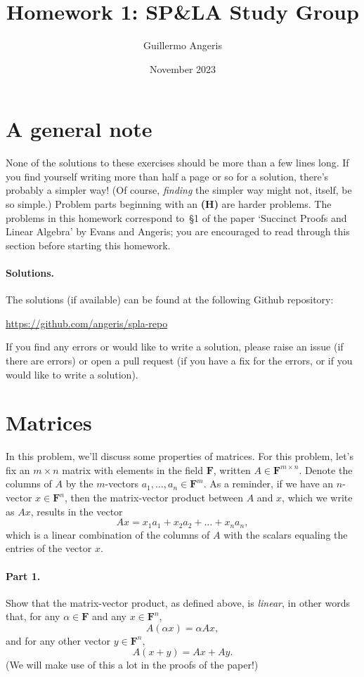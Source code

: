 \documentclass[12pt,hidelinks]{article}
\title{Homework 1: SP\&LA Study Group}
\author{Guillermo Angeris}
\date{November 2023}
\newcommand{\field}{\mathbf{F}}
\begin{document}
 
\maketitle 

\section*{A general note}
None of the solutions to these exercises should be more than a few lines long.
If you find yourself writing more than half a page or so for a solution,
there's probably a simpler way! (Of course, \emph{finding} the simpler way
might not, itself, be so simple.) Problem parts beginning with an {\bf (H)} are
harder problems. The problems in this homework correspond to~\S1 of the
paper `Succinct Proofs and Linear Algebra' by Evans and Angeris; you are
encouraged to read through this section before starting this homework.

\paragraph{Solutions.} The solutions (if available) can be found at the
following Github repository:
\begin{center}
    \url{https://github.com/angeris/spla-repo}
\end{center}
If you find any errors or would like to write a solution, please raise an issue
(if there are errors) or open a pull request (if you have a fix for the errors,
or if you would like to write a solution).

\section{Matrices}
In this problem, we'll discuss some properties of matrices. For this problem,
let's fix an $m\times n$ matrix with elements in the field $\field$, written $A
\in \field^{m\times n}$. Denote the columns of $A$ by the $m$-vectors $a_1,
\dots, a_n \in \field^m$. As a reminder, if we have an $n$-vector $x \in
\field^n$, then the matrix-vector product between $A$ and $x$, which we write
as $Ax$, results in the vector
\begin{equation}\label{eq:mat-mul}
    Ax = x_1a_1 + x_2a_2 + \dots + x_n a_n,
\end{equation}
which is a linear combination of the columns of $A$ with the scalars
equaling the entries of the vector $x$.

\paragraph{Part 1.} Show that the matrix-vector product, as defined above, is
\emph{linear}, in other words that, for any $\alpha \in \field$ and any $x \in
\field^n$,
\[
    A(\alpha x) = \alpha Ax,
\]
and for any other vector $y \in \field^n$,
\[
    A(x + y) = Ax + Ay.
\]
(We will make use of this a lot in the proofs of the paper!)
\end{document}
